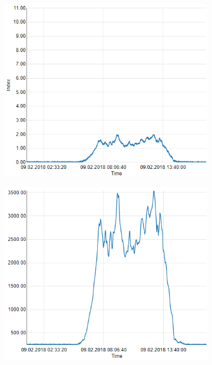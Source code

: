 \documentclass[bachelorthesis, grey, english]{mas-thesis-chapters} %
\begin{document}
\begin{figure}
\begin{subfigure}[c]{0.5\textwidth}
\includegraphics[width=1\textwidth]{expEval/UV_09-02-2018.PNG}
\label{fig:evalUV}
\end{subfigure}
\begin{subfigure}[c]{0.5\textwidth}
\includegraphics[width=1\textwidth]{expEval/IR_09-02-2018.PNG}
\label{fig:evalIR}
\end{subfigure}

\end{figure}
\end{document}
